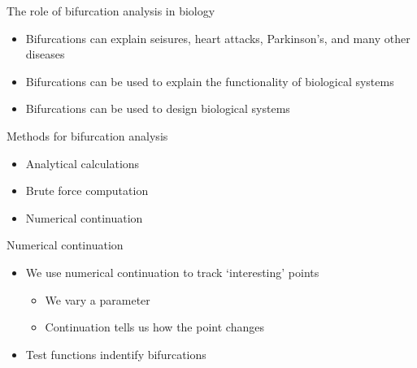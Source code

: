 \documentclass[presentation]{beamer}
\begin{document}
\begin{frame}[label={sec:orgfa560e9}]{The role of bifurcation analysis in biology}
\begin{itemize}
\item Bifurcations can explain seisures, heart attacks, Parkinson's, and many other diseases
\item Bifurcations can be used to explain the functionality of biological systems
\item Bifurcations can be used to design biological systems
\end{itemize}
\end{frame}

\begin{frame}[label={sec:org4a9ea15}]{Methods for bifurcation analysis}
\begin{itemize}
\item Analytical calculations
\item Brute force computation
\item Numerical continuation
\end{itemize}
\end{frame}

\begin{frame}[label={sec:org8bb8765}]{Numerical continuation}
\begin{itemize}
\item We use numerical continuation to track `interesting' points
\begin{itemize}
\item We vary a parameter
\item Continuation tells us how the point changes
\end{itemize}
\item Test functions indentify bifurcations
\end{itemize}
\end{frame}
\end{document}

